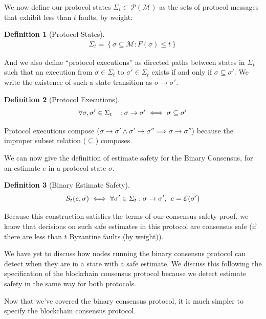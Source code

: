 \documentclass{article}
\theoremstyle{definition}
\newtheorem{defn}{Definition}[section]
\begin{document}
We now define our protocol states $\Sigma_t \subset \mathcal{P}(\mathcal{M})$ as the sets of protocol messages that exhibit less than $t$ faults, by weight:

\begin{defn}[Protocol States]
\begin{align}
\Sigma_t = \left\{\sigma \subseteq \mathcal{M}: F(\sigma) \leq t \right\}
\end{align}
\end{defn}

And we also define ``protocol executions'' as directed paths between states in $\Sigma_t$ such that an execution from $\sigma \in \Sigma_t$ to $\sigma' \in \Sigma_t$ exists if and only if $\sigma \subseteq \sigma'$. We write the existence of such a state transition as $\sigma \to \sigma'$.

\begin{defn}[Protocol Executions]
\begin{align}
\forall \sigma, \sigma' \in \Sigma_t \hspace{3mm} : \sigma \to \sigma' \iff \sigma \subseteq \sigma'
\end{align}
\end{defn}

Protocol executions compose ($\sigma \to \sigma' \land \sigma' \to \sigma'' \implies \sigma \to \sigma''$) because the improper subset relation ($\subseteq$) composes.

We can now give the definition of estimate safety for the Binary Consensus, for an estimate $e$ in a protocol state $\sigma$.

\begin{defn}[Binary Estimate Safety]
$$
S_t(e, \sigma) \iff \forall \sigma' \in \Sigma_t: \sigma \to \sigma',\hspace{1.5mm} e = \mathcal{E}(\sigma')
$$
\end{defn}

Because this construction satisfies the terms of our consensus safety proof, we know that decisions on such safe estimates in this protocol are consensus safe (if there are less than $t$ Byzantine faults (by weight)).

We have yet to discuss how nodes running the binary consensus protocol can detect when they are in a state with a safe estimate. We discuss this following the specification of the blockchain consensus protocol because we detect estimate safety in the same way for both protocols.

Now that we've covered the binary consensus protocol, it is much simpler to specify the blockchain consensus protocol.
\end{document}
